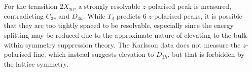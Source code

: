 For the transition $2X_{\bar{2}0}$, a strongly resolvable $z$-polarised peak is measured, contradicting $C_{3v}$ and $D_{3h}$. While $T_d$ predicts $6$ $z$-polarised peaks, it is possible that they are too tightly spaced to be resolvable, especially since the energy splitting may be reduced due to the approximate nature of elevating to the bulk within symmetry suppression theory. The Karlsson data does not measure the $z$-polarised line, which instead suggests elevation to $D_{3h}$, but that is forbidden by the lattice symmetry.

